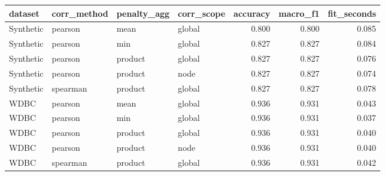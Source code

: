 \begin{tabular}{llllrrr}
\toprule
dataset & corr\_method & penalty\_agg & corr\_scope & accuracy & macro\_f1 & fit\_seconds \\
\midrule
Synthetic & pearson & mean & global & 0.800 & 0.800 & 0.085 \\
Synthetic & pearson & min & global & 0.827 & 0.827 & 0.084 \\
Synthetic & pearson & product & global & 0.827 & 0.827 & 0.076 \\
Synthetic & pearson & product & node & 0.827 & 0.827 & 0.074 \\
Synthetic & spearman & product & global & 0.827 & 0.827 & 0.078 \\
WDBC & pearson & mean & global & 0.936 & 0.931 & 0.043 \\
WDBC & pearson & min & global & 0.936 & 0.931 & 0.037 \\
WDBC & pearson & product & global & 0.936 & 0.931 & 0.040 \\
WDBC & pearson & product & node & 0.936 & 0.931 & 0.040 \\
WDBC & spearman & product & global & 0.936 & 0.931 & 0.042 \\
\bottomrule
\end{tabular}
